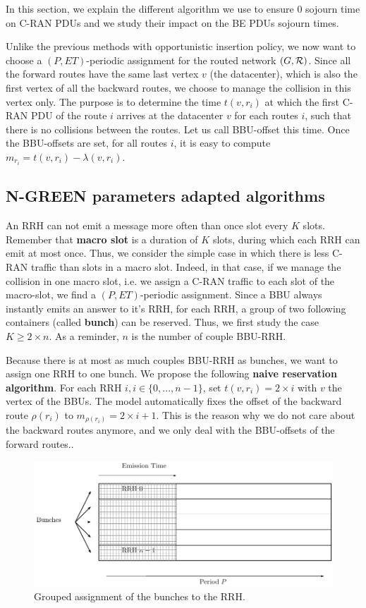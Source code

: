 \documentclass[]{algotel}
\begin{document}
In this section, we explain the different algorithm we use to ensure $0$ sojourn time on C-RAN PDUs and we study their impact on the BE PDUs sojourn times.
  
Unlike the previous methods with opportunistic insertion policy, we now want to choose a $(P,ET)$-periodic assignment for the routed network $(G,{\cal R})$. Since all the forward routes have the same last vertex $v$ (the datacenter), which is also the first vertex of all the backward routes, we choose to manage the collision in this vertex only. The purpose is to determine the time $t(v,r_i)$ at which the first C-RAN PDU of the route $i$ arrives at the datacenter $v$ for each routes $i$, such that there is no collisions between the routes. Let us call BBU-offset this time. Once the BBU-offsets are set, for all routes $i$, it is easy to compute $m_{r_i} = t(v,r_i) - \lambda(v,r_i)$.


\subsection{N-GREEN parameters adapted algorithms}
An RRH can not emit a message more often than once slot every $K$ slots. Remember that {\bf macro slot} is a duration of $K$ slots, during which each RRH can emit at most once. Thus, we consider the simple case in which there is less C-RAN traffic than slots in a macro slot. Indeed, in that case, if we manage the collision in one macro slot, i.e. we assign a C-RAN traffic to each slot of the macro-slot, we find a  $(P,ET)$-periodic assignment. Since a BBU always instantly emits an answer to it's RRH, for each RRH, a group of two following containers (called {\bf bunch}) can be reserved. Thus, we first study the case $K \ge 2\times n$. As a reminder, $n$ is the number of couple BBU-RRH. 

 
 Because there is at most as much couples BBU-RRH as bunches, we want to assign one RRH to one bunch.
We propose the following {\bf naive reservation algorithm}. For each RRH $i, i\in \{0,...,n-1\} $, set $t(v,r_i)= 2\times i$ with $v$ the vertex of the BBUs. The model automatically fixes the offset of the backward route $\rho(r_i)$ to $m_{\rho(r_i)}= 2\times i +1$. This is the reason why we do not care about the backward routes anymore, and we only deal with the BBU-offsets of the forward routes..
   \begin{figure}[h]
\centering
      \includegraphics[scale=0.7]{freqgrouped.pdf}
     \caption{Grouped assignment of the bunches to the RRH.}   \label{fig:freqG}
  \end{figure}
\end{document}
